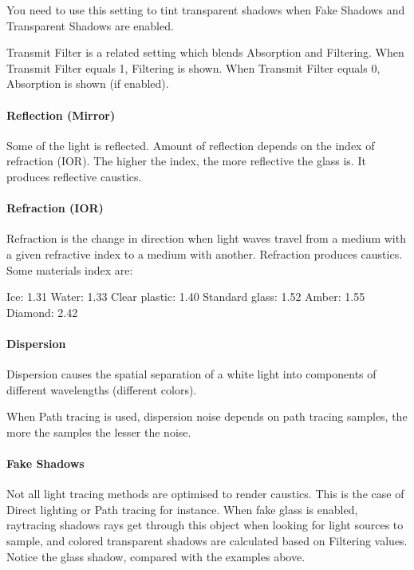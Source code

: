 You need to use this setting to tint transparent shadows when Fake Shadows and Transparent Shadows are enabled.

Transmit Filter is a related setting which blends Absorption and Filtering. When Transmit Filter equals 1, Filtering is shown. When Transmit Filter equals 0, Absorption is shown (if enabled).

\paragraph{Reflection (Mirror)}

Some of the light is reflected. Amount of reflection depends on the index of refraction (IOR). The higher the index, the more reflective the glass is. It produces reflective caustics.

\paragraph{Refraction (IOR)}

Refraction is the change in direction when light waves travel from a medium with a given refractive index to a medium with another. Refraction produces caustics. Some materials index are:

Ice: 1.31
Water: 1.33
Clear plastic: 1.40
Standard glass: 1.52
Amber: 1.55
Diamond: 2.42


\paragraph{Dispersion}

Dispersion causes the spatial separation of a white light into components of different wavelengths (different colors).

When Path tracing is used, dispersion noise depends on path tracing samples, the more the samples the lesser the noise.


\paragraph{Fake Shadows}

Not all light tracing methods are optimised to render caustics. This is the case of Direct lighting or Path tracing for instance. When fake glass is enabled, raytracing shadows rays get through this object when looking for light sources to sample, and colored transparent shadows are calculated based on Filtering values. Notice the glass shadow, compared with the examples above.

